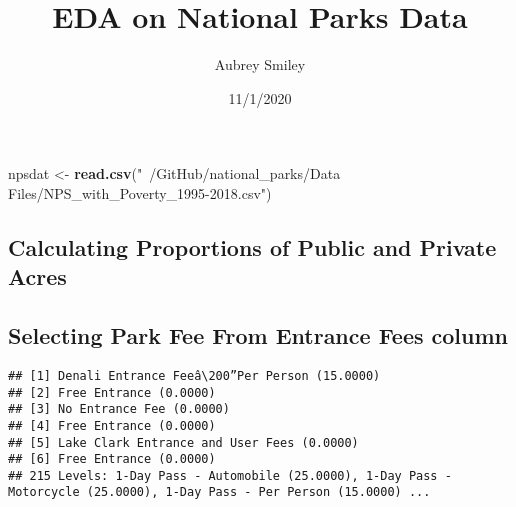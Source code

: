 \documentclass[
]{article}
\title{EDA on National Parks Data}
\author{Aubrey Smiley}
\date{11/1/2020}
\newenvironment{Shaded}{\begin{snugshade}}{\end{snugshade}}
\newcommand{\KeywordTok}[1]{\textcolor[rgb]{0.13,0.29,0.53}{\textbf{#1}}}
\newcommand{\NormalTok}[1]{#1}
\newcommand{\OperatorTok}[1]{\textcolor[rgb]{0.81,0.36,0.00}{\textbf{#1}}}
\newcommand{\StringTok}[1]{\textcolor[rgb]{0.31,0.60,0.02}{#1}}
\begin{document}
\maketitle

\begin{Shaded}
\begin{Highlighting}[]
\NormalTok{npsdat <-}\StringTok{ }\KeywordTok{read.csv}\NormalTok{(}\StringTok{"~/GitHub/national_parks/Data Files/NPS_with_Poverty_1995-2018.csv"}\NormalTok{)}
\end{Highlighting}
\end{Shaded}

\hypertarget{calculating-proportions-of-public-and-private-acres}{%
\subsection{Calculating Proportions of Public and Private
Acres}\label{calculating-proportions-of-public-and-private-acres}}

\begin{Shaded}
\end{Shaded}

\hypertarget{selecting-park-fee-from-entrance-fees-column}{%
\subsection{Selecting Park Fee From Entrance Fees
column}\label{selecting-park-fee-from-entrance-fees-column}}

\begin{Shaded}
\end{Shaded}

\begin{verbatim}
## [1] Denali Entrance Feeâ\200”Per Person (15.0000)
## [2] Free Entrance (0.0000)                    
## [3] No Entrance Fee (0.0000)                  
## [4] Free Entrance (0.0000)                    
## [5] Lake Clark Entrance and User Fees (0.0000)
## [6] Free Entrance (0.0000)                    
## 215 Levels: 1-Day Pass - Automobile (25.0000), 1-Day Pass - Motorcycle (25.0000), 1-Day Pass - Per Person (15.0000) ...
\end{verbatim}
\end{document}
